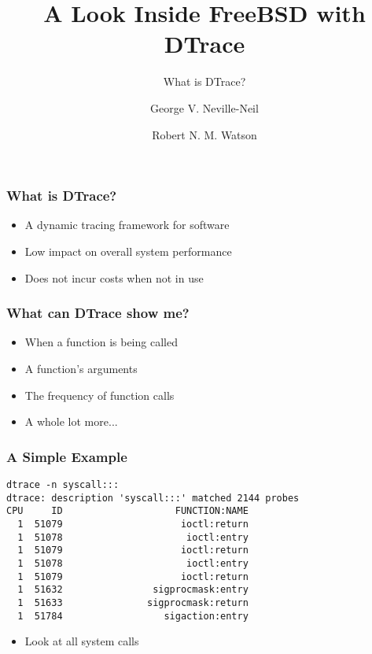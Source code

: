 \documentclass[pdftex]{beamer}
\begin{document}

\title{A Look Inside FreeBSD with DTrace}
\subtitle{What is DTrace?}
\author[shortname]{George V. Neville-Neil \and Robert N. M. Watson}

\begin{frame}
  \titlepage
\end{frame}

\begin{frame}
  \frametitle{What is DTrace?}
  \begin{itemize}
  \item A dynamic tracing framework for software
  \item Low impact on overall system performance
  \item Does not incur costs when not in use
  \end{itemize}
\end{frame}

\begin{frame}
  \frametitle{What can DTrace show me?}
  \begin{itemize}
  \item When a function is being called
  \item A function's arguments
  \item The frequency of function calls
  \item A whole lot more...
  \end{itemize}
\end{frame}

\begin{frame}[fragile]
  \frametitle{A Simple Example}
  \begin{lstlisting}
dtrace -n syscall:::
dtrace: description 'syscall:::' matched 2144 probes
CPU     ID                    FUNCTION:NAME
  1  51079                     ioctl:return 
  1  51078                      ioctl:entry 
  1  51079                     ioctl:return 
  1  51078                      ioctl:entry 
  1  51079                     ioctl:return 
  1  51632                sigprocmask:entry 
  1  51633               sigprocmask:return 
  1  51784                  sigaction:entry 
  \end{lstlisting}
  \begin{itemize}
  \item Look at all system calls
  \end{itemize}
\end{frame}
\end{document}
